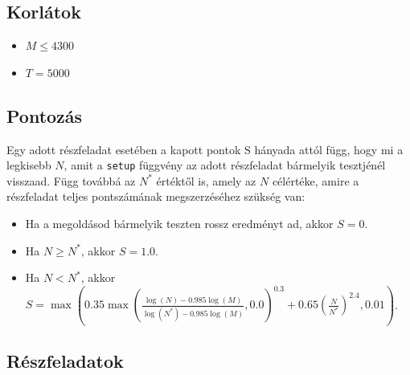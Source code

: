 \documentclass[12pt]{article}
\begin{document}
\subsection{Korlátok}

\begin{itemize}
\item $M \leq 4300$
\item $T = 5000$
\end{itemize}

\subsection{Pontozás}

Egy adott részfeladat esetében a kapott pontok S hányada attól függ, hogy mi a legkisebb $N$, amit a \texttt{setup} függvény az adott részfeladat bármelyik tesztjénél visszaad. Függ továbbá az $N^*$ értéktől is, amely az $N$ célértéke, amire a részfeladat teljes pontszámának megszerzéséhez szükség van:

\begin{itemize}
\item Ha a megoldásod bármelyik teszten rossz eredményt ad, akkor $S = 0$.
\item Ha $N \geq N^*$, akkor $S = 1.0$.
\item Ha $N < N^*$, akkor $S = \max\left(0.35 \max\left(\frac{\log(N) - 0.985 \log(M)}{\log(N^*) - 0.985 \log(M)}, 0.0\right)^{0.3} + 0.65 \left(\frac{N}{N^*}\right)^{2.4}, 0.01\right)$.
\end{itemize}

\subsection{Részfeladatok}
\end{document}
